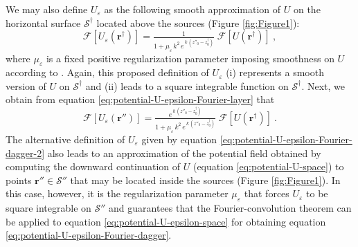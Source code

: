 We may also define $U_{\varepsilon}$ as the following smooth approximation of $U$ on the horizontal surface 
$\mathcal{S}^{\dagger}$ located above the sources (Figure \ref{fig:Figure1}):
\begin{equation}
	\mathcal{F} [ U_{\varepsilon}(\mathbf{r}^{\dagger}) ] = 
	\tfrac{1}{1 + \mu_{\varepsilon} \, k^{2} \, e^{\, k \, (z''_{0} - z^{\dagger}_{0})}} \; 
	\mathcal{F} [ U(\mathbf{r}^{\dagger}) ] \: ,
	\label{eq:potential-U-epsilon-Fourier-dagger-2}
\end{equation}
where $\mu_{\varepsilon}$ is a fixed positive regularization parameter imposing smoothness on $U$ 
according to \citet{pasteka_etal2012}. 
Again, this proposed definition of $U_{\varepsilon}$ 
(i) represents a smooth version of $U$ on $\mathcal{S}^{\dagger}$ and
(ii) leads to a square integrable function on $\mathcal{S}^{\dagger}$.
Next, we obtain from equation \ref{eq:potential-U-epsilon-Fourier-layer} that 
\begin{equation}
	\mathcal{F} \left[ U_{\varepsilon}(\mathbf{r}'') \right] = 
	\tfrac{e^{\, k \, (z''_{0} - z^{\dagger}_{0})}}{1 + \mu_{\varepsilon} \, k^{2} \, e^{\, k \, (z''_{0} - z^{\dagger}_{0})}} \; 
	\mathcal{F} [ U(\mathbf{r}^{\dagger}) ] \: .
	\label{eq:potential-U-epsilon-Fourier-layer-2}
\end{equation}
The alternative definition of $U_{\varepsilon}$ given by equation \ref{eq:potential-U-epsilon-Fourier-dagger-2} 
also leads to an approximation of the potential field obtained by 
computing the downward continuation of $U$ (equation \ref{eq:potential-U-space}) 
to points $\mathbf{r}'' \in \mathcal{S}''$ that may be located inside the sources (Figure \ref{fig:Figure1}). 
In this case, however, it is the regularization parameter $\mu_{\varepsilon}$ that forces  
$U_{\varepsilon}$ to be square integrable on $\mathcal{S}''$ and guarantees that the 
Fourier-convolution theorem can be applied to equation \ref{eq:potential-U-epsilon-space} 
for obtaining equation \ref{eq:potential-U-epsilon-Fourier-dagger}.

